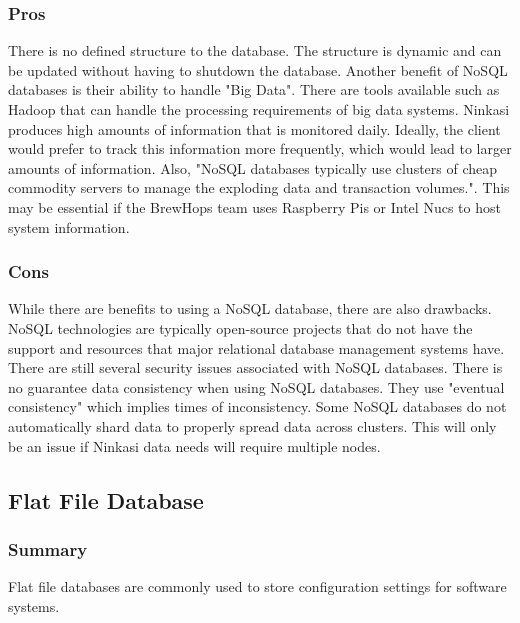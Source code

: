 \documentclass[draftclsnofoot,onecolumn,letterpaper,10pt,compsoc]{IEEEtran}
\begin{document}
        \subsubsection{Pros}
            There is no defined structure to the database.
            The structure is dynamic and can be updated without having to shutdown the database\cite{MongoDBProsCons}.
            Another benefit of NoSQL databases is their ability to handle "Big Data".
            There are tools available such as Hadoop that can handle the processing requirements of big data systems\cite{NoSQLProsCons}.
            Ninkasi produces high amounts of information that is monitored daily.
            Ideally, the client would prefer to track this information more frequently, which would lead to larger amounts of information.
            Also, "NoSQL databases typically use clusters of cheap commodity servers to manage the exploding data and transaction volumes."\cite{NoSQLProsCons}.
            This may be essential if the BrewHops team uses Raspberry Pis or Intel Nucs to host system information.
            
    
        \subsubsection{Cons}
            While there are benefits to using a NoSQL database, there are also drawbacks.
            NoSQL technologies are typically open-source projects that do not have the support and resources that major relational database management systems have\cite{NoSQLProsCons}.
            There are still several security issues associated with NoSQL databases\cite{NoSQLSecurityIssues}.
            There is no guarantee data consistency when using NoSQL databases\cite{ChannelFutures}.
            They use "eventual consistency" which implies times of inconsistency.
            Some NoSQL databases do not automatically shard data to properly spread data across clusters\cite{ChannelFutures}.
            This will only be an issue if Ninkasi data needs will require multiple nodes.
        
        
	\subsection{Flat File Database}
        \subsubsection{Summary}
            Flat file databases are commonly used to store configuration settings for software systems.
        
\end{document}
